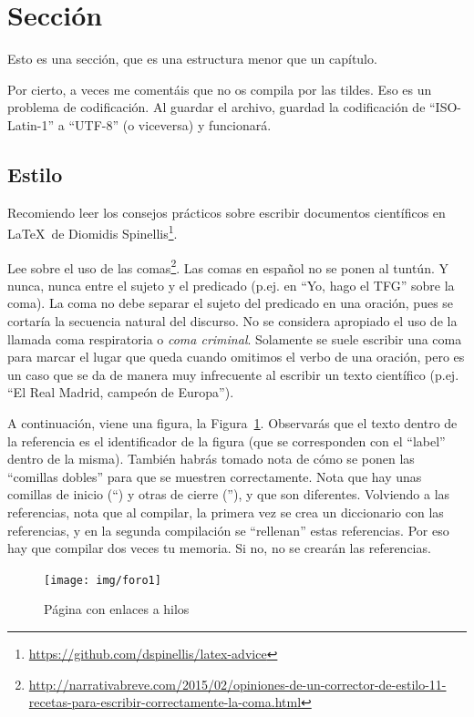 \documentclass[a4paper, 12pt]{book}
\begin{document}
\section{Sección}
\label{sec:seccion}

Esto es una sección, que es una estructura menor que un capítulo. 

Por cierto, a veces me comentáis que no os compila por las tildes.
Eso es un problema de codificación.
Al guardar el archivo, guardad la codificación de ``ISO-Latin-1'' a ``UTF-8'' (o viceversa) y funcionará.

\subsection{Estilo}
\label{subsec:estilo}

Recomiendo leer los consejos prácticos sobre escribir documentos científicos en \LaTeX \ de Diomidis Spinellis\footnote{\url{https://github.com/dspinellis/latex-advice}}.

Lee sobre el uso de las comas\footnote{\url{http://narrativabreve.com/2015/02/opiniones-de-un-corrector-de-estilo-11-recetas-para-escribir-correctamente-la-coma.html}}. 
Las comas en español no se ponen al tuntún.
Y nunca, nunca entre el sujeto y el predicado (p.ej. en ``Yo, hago el TFG'' sobre la coma).
La coma no debe separar el sujeto del predicado en una oración, pues se cortaría la secuencia natural del discurso.
No se considera apropiado el uso de la llamada coma respiratoria o \emph{coma criminal}.
Solamente se suele escribir una coma para marcar el lugar que queda cuando omitimos el verbo de una oración, pero es un caso que se da de manera muy infrecuente al escribir un texto científico (p.ej. ``El Real Madrid, campeón de Europa'').

A continuación, viene una figura, la Figura~\ref{figura:foro_hilos}. 
Observarás que el texto dentro de la referencia es el identificador de la figura (que se corresponden con el ``label'' dentro de la misma). 
También habrás tomado nota de cómo se ponen las ``comillas dobles'' para que se muestren correctamente. 
Nota que hay unas comillas de inicio (``) y otras de cierre (''), y que son diferentes.
Volviendo a las referencias, nota que al compilar, la primera vez se crea un diccionario con las referencias, y en la segunda compilación se ``rellenan'' estas referencias. 
Por eso hay que compilar dos veces tu memoria.
Si no, no se crearán las referencias.



 \begin{figure}
    \centering
    \texttt{[image: img/foro1]}
    \caption{Página con enlaces a hilos}
    \label{figura:foro_hilos}
 \end{figure}
\end{document}
